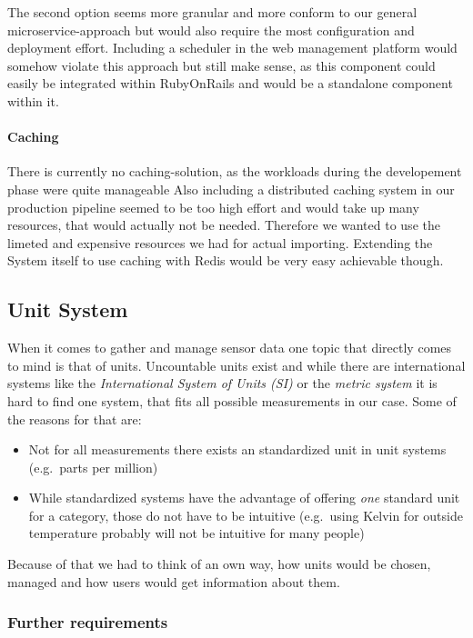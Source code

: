 The second option seems more granular and more conform to our general
microservice-approach but would also require the most configuration and
deployment effort. Including a scheduler in the web management platform
would somehow violate this approach but still make sense, as this
component could easily be integrated within RubyOnRails and would be a
standalone component within it.

\paragraph{Caching}\label{caching}

There is currently no caching-solution, as the workloads during the
developement phase were quite manageable Also including a distributed
caching system in our production pipeline seemed to be too high effort
and would take up many resources, that would actually not be needed.
Therefore we wanted to use the limeted and expensive resources we had
for actual importing. Extending the System itself to use caching with
Redis would be very easy achievable though.

\subsection{Unit System}\label{unit-system}

When it comes to gather and manage sensor data one topic that directly
comes to mind is that of units. Uncountable units exist and while there
are international systems like the \emph{International System of Units
	(SI)} or the \emph{metric system} it is hard to find one system, that
fits all possible measurements in our case. Some of the reasons for that
are:

\begin{itemize}
	\item
	Not for all measurements there exists an standardized unit in unit
	systems (e.g.~parts per million)
	\item
	While standardized systems have the advantage of offering \emph{one}
	standard unit for a category, those do not have to be intuitive
	(e.g.~using Kelvin for outside temperature probably will not be
	intuitive for many people)
\end{itemize}

Because of that we had to think of an own way, how units would be
chosen, managed and how users would get information about them.

\subsubsection{Further requirements}\label{further-requirements}

